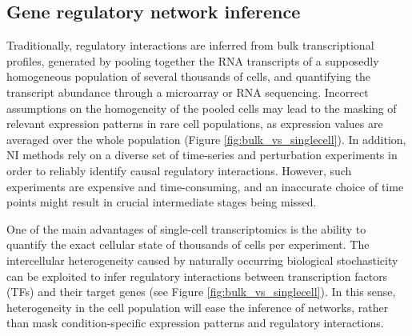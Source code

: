 
\subsection{Gene regulatory network inference}

Traditionally, regulatory interactions are inferred from bulk transcriptional profiles, generated by pooling together the RNA transcripts of a supposedly homogeneous population of several thousands of cells, and quantifying the transcript abundance through a microarray or RNA sequencing.
Incorrect assumptions on the homogeneity of the pooled cells may lead to the masking of relevant expression patterns in rare cell populations, as expression values are averaged over the whole population (Figure \ref{fig:bulk_vs_singlecell}). 
In addition, NI methods rely on a diverse set of time-series and perturbation experiments in order to reliably identify causal regulatory interactions. However, such experiments are expensive and time-consuming, and an inaccurate choice of time points might result in crucial intermediate stages being missed.

One of the main advantages of single-cell transcriptomics is the ability to quantify the exact cellular state of thousands of cells per experiment. The intercellular heterogeneity caused by naturally occurring biological stochasticity \cite{Padovan-Merhar2013} can be exploited to infer regulatory interactions between transcription factors (TFs) and their target genes (see Figure \ref{fig:bulk_vs_singlecell}).
In this sense, heterogeneity in the cell population will ease the inference of networks, rather than mask condition-specific expression patterns and regulatory interactions.

